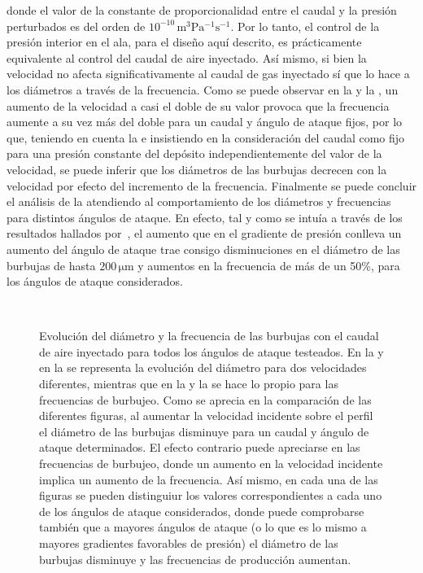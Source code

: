 donde el valor de la constante de proporcionalidad entre el caudal y la presión perturbados es del orden de $10^{-10}\,\mathrm{m^{3}Pa^{-1}s^{-1}}$. Por lo tanto, el control de la presión interior en el ala, para el diseño aquí descrito, es prácticamente equivalente al control del caudal de aire inyectado. Así mismo, si bien la velocidad no afecta significativamente al caudal de gas inyectado sí que lo hace a los diámetros a través de la frecuencia. Como se puede observar en la  y la , un aumento de la velocidad a casi el doble de su valor provoca que la frecuencia aumente a su vez más del doble para un caudal y ángulo de ataque fijos, por lo que, teniendo en cuenta la  e insistiendo en la consideración del caudal como fijo para una presión constante del depósito independientemente del valor de la velocidad, se puede inferir que los diámetros de las burbujas decrecen con la velocidad por efecto del incremento de la frecuencia. Finalmente se puede concluir el análisis de la  atendiendo al comportamiento de los diámetros y frecuencias para distintos ángulos de ataque. En efecto, tal y como se intuía a través de los resultados hallados por~\cite{Evangelio2015}, el aumento que en el gradiente de presión conlleva un aumento del ángulo de ataque trae consigo disminuciones en el diámetro de las burbujas de hasta $200\,\mathrm{\mu m}$ y aumentos en la frecuencia de más de un 50\%, para los ángulos de ataque considerados. 

\begin{figure}
\centering
{}
\\
\caption{Evolución del diámetro y la frecuencia de las burbujas con el caudal de aire inyectado para todos los ángulos de ataque testeados. En la  y en la  se representa la evolución del diámetro para dos velocidades diferentes, mientras que en la  y la  se hace lo propio para las frecuencias de burbujeo. Como se aprecia en la comparación de las diferentes figuras, al aumentar la velocidad incidente sobre el perfil el diámetro de las burbujas disminuye para un caudal y ángulo de ataque determinados. El efecto contrario puede apreciarse en las frecuencias de burbujeo, donde un aumento en la velocidad incidente implica un aumento de la frecuencia. Así mismo, en cada una de las figuras se pueden distinguiur los valores correspondientes a cada uno de los ángulos de ataque considerados, donde puede comprobarse también que a mayores ángulos de ataque (o lo que es lo mismo a mayores gradientes favorables de presión) el diámetro de las burbujas disminuye y las frecuencias de producción aumentan. }
\end{figure}



